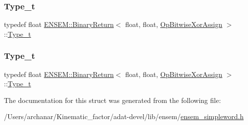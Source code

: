 \mbox{\label{structENSEM_1_1BinaryReturn_3_01float_00_01float_00_01OpBitwiseXorAssign_01_4_a6716df2454c53484524a0d243395b2ed}} 
\subsubsection{\texorpdfstring{Type\_t}{Type\_t}\hspace{0.1cm}{\footnotesize\ttfamily [2/3]}}
{\footnotesize\ttfamily typedef float \mbox{\hyperlink{structENSEM_1_1BinaryReturn}{E\+N\+S\+E\+M\+::\+Binary\+Return}}$<$ float, float, \mbox{\hyperlink{structENSEM_1_1OpBitwiseXorAssign}{Op\+Bitwise\+Xor\+Assign}} $>$\+::\mbox{\hyperlink{structENSEM_1_1BinaryReturn_3_01float_00_01float_00_01OpBitwiseXorAssign_01_4_a6716df2454c53484524a0d243395b2ed}{Type\+\_\+t}}}

\mbox{\label{structENSEM_1_1BinaryReturn_3_01float_00_01float_00_01OpBitwiseXorAssign_01_4_a6716df2454c53484524a0d243395b2ed}} 
\subsubsection{\texorpdfstring{Type\_t}{Type\_t}\hspace{0.1cm}{\footnotesize\ttfamily [3/3]}}
{\footnotesize\ttfamily typedef float \mbox{\hyperlink{structENSEM_1_1BinaryReturn}{E\+N\+S\+E\+M\+::\+Binary\+Return}}$<$ float, float, \mbox{\hyperlink{structENSEM_1_1OpBitwiseXorAssign}{Op\+Bitwise\+Xor\+Assign}} $>$\+::\mbox{\hyperlink{structENSEM_1_1BinaryReturn_3_01float_00_01float_00_01OpBitwiseXorAssign_01_4_a6716df2454c53484524a0d243395b2ed}{Type\+\_\+t}}}



The documentation for this struct was generated from the following file\+:\begin{DoxyCompactItemize}
\item 
/\+Users/archanar/\+Kinematic\+\_\+factor/adat-\/devel/lib/ensem/\mbox{\hyperlink{adat-devel_2lib_2ensem_2ensem__simpleword_8h}{ensem\+\_\+simpleword.\+h}}\end{DoxyCompactItemize}
